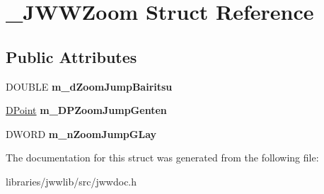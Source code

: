 \hypertarget{struct__JWWZoom}{\section{\-\_\-\-J\-W\-W\-Zoom Struct Reference}
\label{struct__JWWZoom}
}
\subsection*{Public Attributes}
\begin{DoxyCompactItemize}
\item 
\hypertarget{struct__JWWZoom_ae1c39a1a34e76bd51f20e90aa3eaf464}{D\-O\-U\-B\-L\-E {\bfseries m\-\_\-d\-Zoom\-Jump\-Bairitsu}}\label{struct__JWWZoom_ae1c39a1a34e76bd51f20e90aa3eaf464}

\item 
\hypertarget{struct__JWWZoom_ab9d87918272aa230f999aa29caac2635}{\hyperlink{struct__DPoint}{D\-Point} {\bfseries m\-\_\-\-D\-P\-Zoom\-Jump\-Genten}}\label{struct__JWWZoom_ab9d87918272aa230f999aa29caac2635}

\item 
\hypertarget{struct__JWWZoom_a3621bda957dc5f80878ed00b2e631a18}{D\-W\-O\-R\-D {\bfseries m\-\_\-n\-Zoom\-Jump\-G\-Lay}}\label{struct__JWWZoom_a3621bda957dc5f80878ed00b2e631a18}

\end{DoxyCompactItemize}


The documentation for this struct was generated from the following file\-:\begin{DoxyCompactItemize}
\item 
libraries/jwwlib/src/jwwdoc.\-h\end{DoxyCompactItemize}
